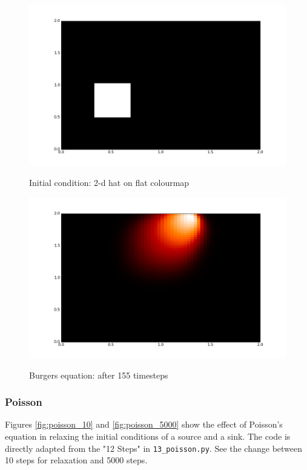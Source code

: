 \documentclass[11pt]{article}
\begin{document}
{	\begin{figure}[H]
	\centering
	\caption{Initial condition: 2-d hat on flat colourmap}
	\includegraphics[scale=0.7]{burger_0.png}
	\label{fig:burger_0}
	\end{figure}

	\begin{figure}[H]
	\centering
	\caption{Burgers equation: after 155 timesteps}
	\includegraphics[scale=0.7]{burger_final.png}
	\label{fig:burger_final}
	\end{figure}

\subsubsection{Poisson}
Figures \ref{fig:poisson_10} and \ref{fig:poisson_5000} show the effect of Poisson's
equation in relaxing the initial conditions of a source and a sink. The code is directly
adapted from the "12 Steps" in \texttt{13\_poisson.py}. See the change between 10 steps
for relaxation and 5000 steps.

}
\end{document}
